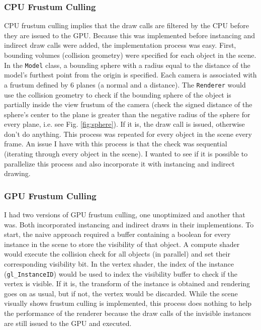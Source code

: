 \documentclass[letterpaper, 10 pt, conference]{ieeeconf}  %
\begin{document}
\subsubsection {CPU Frustum Culling}
CPU frustum culling implies that the draw calls are filtered by the CPU before they are issued to the GPU. Because this was implemented before instancing and indirect draw calls were added, the implementation process was easy. First, bounding volumes (collision geometry) were specified for each object in the scene. In the \texttt{Model} class, a bounding sphere with a radius equal to the distance of the model's furthest point from the origin is specified. Each camera is associated with a frustum defined by 6 planes (a normal and a distance). The \texttt{Renderer} would use the collision geometry to check if the bounding sphere of the object is partially inside the view frustum of the camera (check the signed distance of the sphere's center to the plane is greater than the negative radius of the sphere for every plane, i.e. see Fig. \ref{fig:sphere}). If it is, the draw call is issued, otherwise don't do anything. This process was repeated for every object in the scene every frame. An issue I have with this process is that the check was sequential (iterating through every object in the scene). I wanted to see if it is possible to parallelize this process and also incorporate it with instancing and indirect drawing. 

\subsubsection {GPU Frustum Culling}
I had two versions of GPU frustum culling, one unoptimized and another that was. Both incorporated instancing and indirect draws in their implementions. To start, the naive approach required a buffer containing a boolean for every instance in the scene to store the visibility of that object. A compute shader would execute the collision check for all objects (in parallel) and set their corresponding visibility bit. In the vertex shader, the index of the instance (\texttt{gl\_InstanceID}) would be used to index the visibility buffer to check if the vertex is visible. If it is, the transform of the instance is obtained and rendering goes on as usual, but if not, the vertex would be discarded. While the scene visually shows frustum culling is implemented, this process does nothing to help the performance of the renderer because the draw calls of the invisible instances are still issued to the GPU and executed. 
\end{document}
